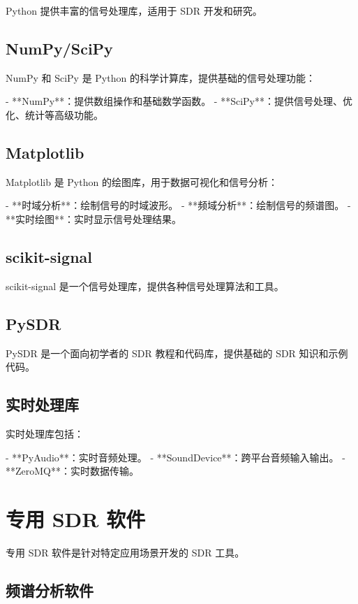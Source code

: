 \documentclass[UTF8]{ctexbook}
\begin{document}
Python 提供丰富的信号处理库，适用于 SDR 开发和研究。

\subsection{NumPy/SciPy}

NumPy 和 SciPy 是 Python 的科学计算库，提供基础的信号处理功能：

- **NumPy**：提供数组操作和基础数学函数。
- **SciPy**：提供信号处理、优化、统计等高级功能。

\subsection{Matplotlib}

Matplotlib 是 Python 的绘图库，用于数据可视化和信号分析：

- **时域分析**：绘制信号的时域波形。
- **频域分析**：绘制信号的频谱图。
- **实时绘图**：实时显示信号处理结果。

\subsection{scikit-signal}

scikit-signal 是一个信号处理库，提供各种信号处理算法和工具。

\subsection{PySDR}

PySDR 是一个面向初学者的 SDR 教程和代码库，提供基础的 SDR 知识和示例代码。

\subsection{实时处理库}

实时处理库包括：

- **PyAudio**：实时音频处理。
- **SoundDevice**：跨平台音频输入输出。
- **ZeroMQ**：实时数据传输。

\section{专用 SDR 软件}

专用 SDR 软件是针对特定应用场景开发的 SDR 工具。

\subsection{频谱分析软件}
\end{document}
